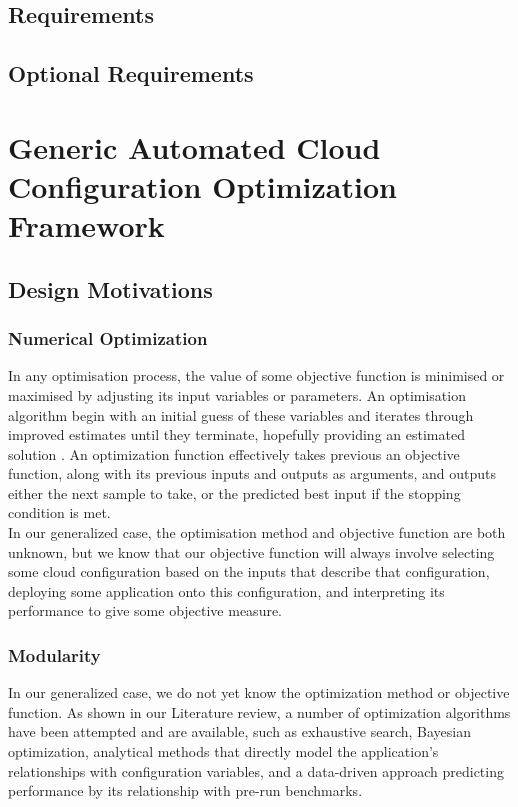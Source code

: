 \documentclass{report}
\begin{document}
\section{Requirements}
\section{Optional Requirements}
\chapter{Generic Automated Cloud Configuration Optimization Framework}
\section{Design Motivations}
\subsection{Numerical Optimization}
In any optimisation process, the value of some objective function is minimised or maximised by adjusting its input variables or parameters. An optimisation algorithm begin with an initial guess of these variables and iterates through improved estimates until they terminate, hopefully providing an estimated solution \cite{Nocedal2006}. An optimization function effectively takes previous an objective function, along with its previous inputs and outputs as arguments, and outputs either the next sample to take, or the predicted best input if the stopping condition is met. \\
In our generalized case, the optimisation method and objective function are both unknown, but we know that our objective function will always involve selecting some cloud configuration based on the inputs that describe that configuration, deploying some application onto this configuration, and interpreting its performance to give some objective measure.
 

\subsection{Modularity}
In our generalized case, we do not yet know the optimization method or objective function. As shown in our Literature review, a number of optimization algorithms have been attempted and are available, such as exhaustive search, Bayesian optimization\cite{Alipourfard2017}, analytical methods that directly model the application's relationships with configuration variables\cite{Venkataraman2016}, and a data-driven approach predicting performance by its relationship with pre-run benchmarks\cite{Yadwadkar2017}.
\end{document}
